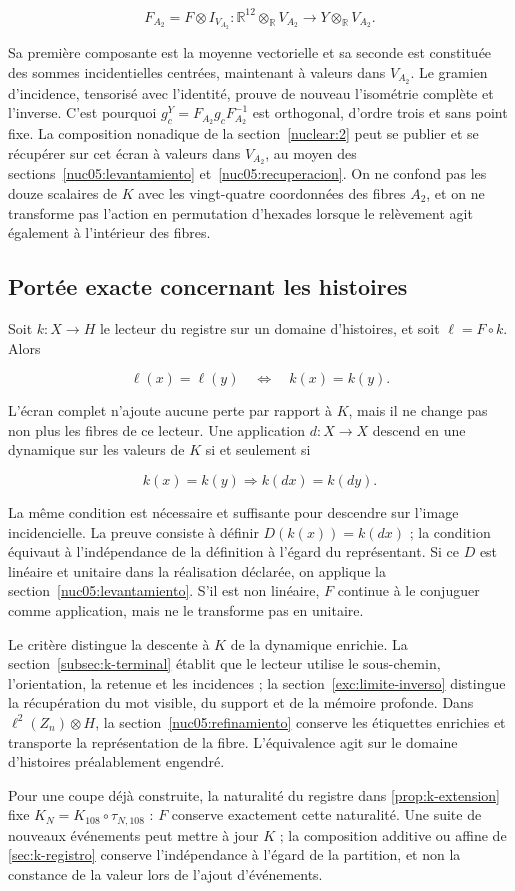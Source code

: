 \[
F_{A_2}=F\otimes I_{V_{A_2}}:
\mathbb R^{12}\otimes_{\mathbb R}V_{A_2}
\longrightarrow Y\otimes_{\mathbb R}V_{A_2}.
\]

Sa première composante est la moyenne vectorielle et sa seconde est constituée des sommes incidentielles centrées, maintenant à valeurs dans \(V_{A_2}\). Le gramien d’incidence, tensorisé avec l’identité, prouve de nouveau l’isométrie complète et l’inverse. C’est pourquoi \(g_c^Y=F_{A_2}g_cF_{A_2}^{-1}\) est orthogonal, d’ordre trois et sans point fixe. La composition nonadique de la section~\ref{nuclear:2} peut se publier et se récupérer sur cet écran à valeurs dans \(V_{A_2}\), au moyen des sections~\ref{nuc05:levantamiento} et~\ref{nuc05:recuperacion}. On ne confond pas les douze scalaires de \(K\) avec les vingt-quatre coordonnées des fibres \(A_2\), et on ne transforme pas l’action en permutation d’hexades lorsque le relèvement agit également à l’intérieur des fibres.


\subsection{Portée exacte concernant les histoires}

Soit \(k:X\to H\) le lecteur du registre sur un domaine d’histoires, et soit \(\ell=F\circ k\). Alors

\[
\ell(x)=\ell(y)\quad\Longleftrightarrow\quad k(x)=k(y).
\]

L’écran complet n’ajoute aucune perte par rapport à \(K\), mais il ne change pas non plus les fibres de ce lecteur. Une application \(d:X\to X\) descend en une dynamique sur les valeurs de \(K\) si et seulement si

\[
k(x)=k(y)\Longrightarrow k(d x)=k(d y).
\]

La même condition est nécessaire et suffisante pour descendre sur l’image incidencielle. La preuve consiste à définir \(D(k(x))=k(dx)\) ; la condition équivaut à l’indépendance de la définition à l’égard du représentant. Si ce \(D\) est linéaire et unitaire dans la réalisation déclarée, on applique la section~\ref{nuc05:levantamiento}. S’il est non linéaire, \(F\) continue à le conjuguer comme application, mais ne le transforme pas en unitaire.

Le critère distingue la descente à \(K\) de la dynamique enrichie. La section~\ref{subsec:k-terminal} établit que le lecteur utilise le sous-chemin, l’orientation, la retenue et les incidences ; la section~\ref{exc:limite-inverso} distingue la récupération du mot visible, du support et de la mémoire profonde. Dans \(\ell^2(Z_n)\otimes H\), la section~\ref{nuc05:refinamiento} conserve les étiquettes enrichies et transporte la représentation de la fibre. L’équivalence agit sur le domaine d’histoires préalablement engendré.

Pour une coupe déjà construite, la naturalité du registre dans \cref{prop:k-extension} fixe \(K_N=K_{108}\circ\tau_{N,108}\) : \(F\) conserve exactement cette naturalité. Une suite de nouveaux événements peut mettre à jour \(K\) ; la composition additive ou affine de \cref{sec:k-registro} conserve l’indépendance à l’égard de la partition, et non la constance de la valeur lors de l’ajout d’événements.
